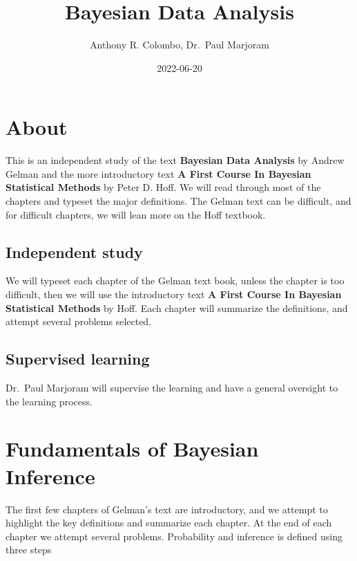 \documentclass[
]{book}
\title{Bayesian Data Analysis}
\author{Anthony R. Colombo, Dr.~Paul Marjoram}
\date{2022-06-20}
\theoremstyle{definition}
\theoremstyle{definition}
\theoremstyle{definition}
\theoremstyle{definition}
\theoremstyle{remark}
\begin{document}
\maketitle

{
\setcounter{tocdepth}{1}
\tableofcontents
}
\hypertarget{about}{%
\chapter*{About}\label{about}}

This is an independent study of the text \textbf{Bayesian Data Analysis} by Andrew Gelman and the more introductory text \textbf{A First Course In Bayesian Statistical Methods} by Peter D. Hoff. We will read through most of the chapters and typeset the major definitions. The Gelman text can be difficult, and for difficult chapters, we will lean more on the Hoff textbook.

\hypertarget{independent-study}{%
\section*{Independent study}\label{independent-study}}

We will typeset each chapter of the Gelman text book, unless the chapter is too difficult, then we will use the introductory text \textbf{A First Course In Bayesian Statistical Methods} by Hoff. Each chapter will summarize the definitions, and attempt several problems selected.

\hypertarget{supervised-learning}{%
\section*{Supervised learning}\label{supervised-learning}}

Dr.~Paul Marjoram will supervise the learning and have a general oversight to the learning process.

\hypertarget{fundamentals-of-bayesian-inference}{%
\chapter{Fundamentals of Bayesian Inference}\label{fundamentals-of-bayesian-inference}}

The first few chapters of Gelman's text are introductory, and we attempt to highlight the key definitions and summarize each chapter. At the end of each chapter we attempt several problems. Probability and inference is defined using three steps
\end{document}
